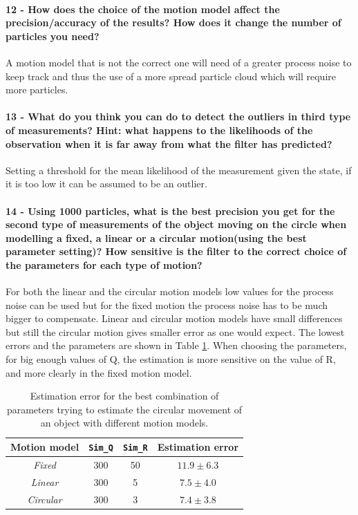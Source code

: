 \documentclass[12pt]{article}
\begin{document}
\paragraph{12 - How does the choice of the motion model affect the precision/accuracy of the results? How does it change the number of particles you need?}
A motion model that is not the correct one will need of a greater process noise to keep track and thus the use of a more spread particle cloud which will require more particles.

\paragraph{13 - What do you think you can do to detect the outliers in third type of measurements? Hint: what happens to the likelihoods of the observation when it is far away from what the filter has predicted?}
Setting a threshold for the mean likelihood of the measurement given the state, if it is too low it can be assumed to be an outlier. 

\paragraph{14 - Using 1000 particles, what is the best precision you get for the second type of measurements of the object moving on the circle when modelling a fixed, a linear or a circular motion(using the best parameter setting)? How sensitive is the filter to the correct choice of the parameters for each type of motion?}
For both the linear and the circular motion models low values for the process noise can be used but for the fixed motion the process noise has to be much bigger to compensate. Linear and circular motion models have small differences but still the circular motion gives smaller error as one would expect. The lowest errors and the parameters are shown in Table \ref{q14}. When choosing the parameters, for big enough values of Q, the estimation is more sensitive on the value of R, and more clearly in the fixed motion model.

\begin{table}[]
\centering
\caption{Estimation error for the best combination of parameters trying to estimate the circular movement of an object with different motion models.}
\label{q14}
\begin{tabular}{ccc|c}
\textbf{Motion model} & \textbf{\texttt{Sim\_Q}} & \textbf{\texttt{Sim\_R}} & \textbf{Estimation error} \\ \hline
\textit{Fixed}        & 300                          & 50                       & \(11.9 \pm 6.3 \)              \\
\textit{Linear}       & 300                          & 5                        & \( 7.5 \pm 4.0     \)           \\
\textit{Circular}     & 300                          & 3                        & \(7.4 \pm 3.8\)               
\end{tabular}
\end{table}
\end{document}
